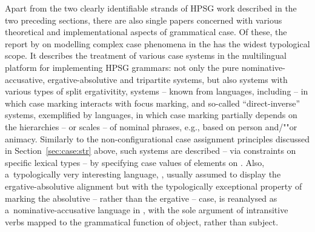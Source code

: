 \documentclass[output=paper
	        ,collection
	        ,collectionchapter
 	        ,biblatex
                ,babelshorthands
                ,newtxmath
                ,draftmode
                ,colorlinks, citecolor=brown
]{./langsci/langscibook}
\begin{document}
\begin{exe}
\begin{xlist}
\begin{exe}
\begin{xlist}
Apart from the two clearly identifiable strands of HPSG work described in the two preceding sections, there are also single papers concerned with various theoretical and implementational aspects of grammatical case.  Of these, the report by \citet{drel:08} on modelling complex case phenomena in the  \citep{BFO2002a-u} has the widest typological scope.  It describes the treatment of various case systems in the multilingual platform for implementing HPSG grammars: not only the pure nominative-accusative, ergative-absolutive and tripartite systems, but also systems with various types of split ergativitity, systems – known from  languages, including  – in which case marking interacts with focus marking, and so-called “direct-inverse” systems, exemplified by  languages, in which case marking partially depends on the hierarchies – or scales – of nominal phrases, e.g., based on person and/""or animacy.  Similarly to the non-configurational case assignment principles discussed in Section~\ref{sec:case:str} above, such systems are described – via constraints on specific lexical types – by specifying case values of elements on .  Also, a~typologically very interesting language, , usually assumed to display the ergative-absolutive alignment but with the typologically exceptional property of marking the absolutive – rather than the ergative – case, is reanalysed as a~nominative-accusative language in \citet{Crysmann2009b-u}, with the sole argument of intransitive verbs mapped to the grammatical function of object, rather than subject.


\end{xlist}
\end{exe}
\end{xlist}
\end{exe}
\end{document}
